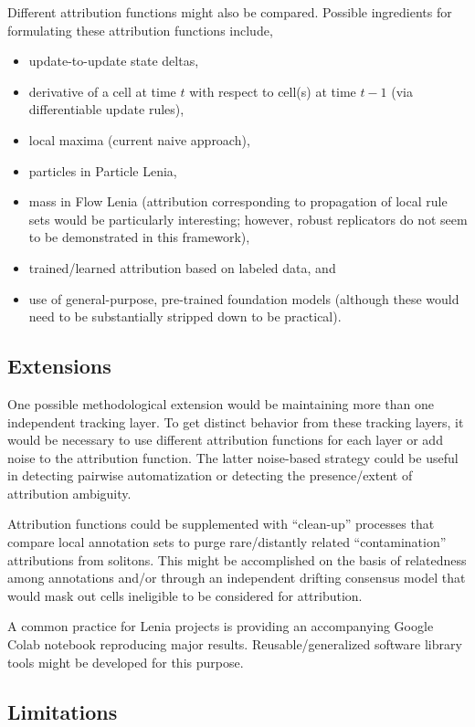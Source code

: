 Different attribution functions might also be compared.
Possible ingredients for formulating these attribution functions include,
\begin{itemize}
\item update-to-update state deltas,
\item derivative of a cell at time $t$ with respect to cell(s) at time $t-1$ (via differentiable update rules),
\item local maxima (current naive approach),
\item particles in Particle Lenia,
\item mass in Flow Lenia (attribution corresponding to propagation of local rule sets would be particularly interesting; however, robust replicators do not seem to be demonstrated in this framework),
\item trained/learned attribution based on labeled data, and
\item use of general-purpose, pre-trained foundation models (although these would need to be substantially stripped down to be practical).
\end{itemize}

\subsection{Extensions}

One possible methodological extension would be maintaining more than one independent tracking layer.
To get distinct behavior from these tracking layers, it would be necessary to use different attribution functions for each layer or add noise to the attribution function.
The latter noise-based strategy could be useful in detecting pairwise automatization or detecting the presence/extent of attribution ambiguity.

Attribution functions could be supplemented with ``clean-up'' processes that compare local annotation sets to purge rare/distantly related ``contamination'' attributions from solitons.
This might be accomplished on the basis of relatedness among annotations and/or through an independent drifting consensus model that would mask out cells ineligible to be considered for attribution.

A common practice for Lenia projects is providing an accompanying Google Colab notebook reproducing major results.
Reusable/generalized software library tools might be developed for this purpose.

\subsection{Limitations}

